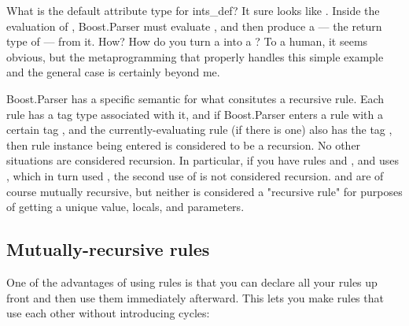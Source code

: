\documentclass{MyBook}
\begin{document}
What is the default attribute type for ints\_def? It sure looks like . Inside the evaluation of , Boost.Parser must evaluate , and then produce a  --- the return type of  --- from it. How? How do you turn a  into a ? To a human, it seems obvious, but the metaprogramming that properly handles this simple example and the general case is certainly beyond me.

Boost.Parser has a specific semantic for what consitutes a recursive rule. Each rule has a tag type associated with it, and if Boost.Parser enters a rule with a certain tag , and the currently-evaluating rule (if there is one) also has the tag , then rule instance being entered is considered to be a recursion. No other situations are considered recursion. In particular, if you have rules  and , and  uses , which in turn used , the second use of  is not considered recursion.  and  are of course mutually recursive, but neither is considered a "recursive rule" for purposes of getting a unique value, locals, and parameters.

\subsection{Mutually-recursive rules}

One of the advantages of using rules is that you can declare all your rules up front and then use them immediately afterward. This lets you make rules that use each other without introducing cycles:

\end{document}
